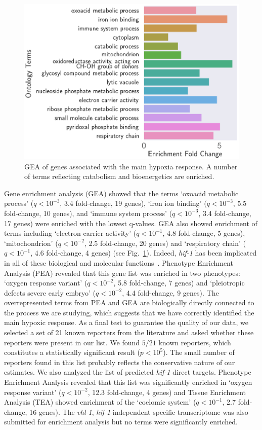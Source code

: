 \documentclass[9pt,twocolumn,twoside]{pnas-new}
\newcommand{\qval}[1]{$q<10^{-#1}$}
\newcommand{\vhl}{\emph{vhl-1}}
\newcommand{\hif}{\emph{hif-1}}
\begin{document}
\begin{figure}[tbhp]
\centering
\includegraphics[width=\linewidth]{figs/hypoxia_response_gea.pdf}
\caption{
GEA of genes associated with the main hypoxia response. A number of terms
reflecting catabolism and bioenergetics are enriched.
}
\label{fig:hyp_gea}
\end{figure}

Gene enrichment analysis (GEA) showed that the terms `oxoacid metabolic process'
(\qval{3}, 3.4 fold-change, 19 genes),
`iron ion binding' (\qval{3}, 5.5 fold-change, 10 genes),
and `immune system process' (\qval{3}, 3.4 fold-change, 17 genes) were enriched
with the lowest q-values. GEA also showed enrichment of terms including
`electron carrier activity' (\qval{1}, 4.8 fold-change, 5 genes),
`mitochondrion' (\qval{2}, 2.5 fold-change, 20 genes)
and `respiratory chain' (\qval{1}, 4.6 fold-change, 4 genes) (see
Fig.~\ref{fig:hyp_gea}). Indeed, \hif{} has been implicated in
all of these biological and molecular functions~\cite{Luhachack2012,Ackerman2012,
Romney2011,Semenza2011}. Phenotype Enrichment Analysis (PEA) revealed that this
gene list was enriched in two phenotypes: `oxygen response variant' (\qval{2},
5.8 fold-change, 7 genes) and `pleiotropic defects severe early embryo' (\qval{2},
4.4 fold-change, 9 genes). The overrepresented terms from PEA and GEA are biologically
directly connected to the process we are studying, which suggests that we have
correctly identified the main hypoxic response. As a final test to guarantee the
quality of our data, we selected a set of 21 known reporters from the literature
and asked whether these reporters were present in our list. We found $5/21$ known
reporters, which constitutes a statistically significant result ($p<10^{5}$).
The small number of reporters found in this list probably reflects the conservative
nature of our estimates. We also analyzed the list of predicted \hif{} direct targets.
Phenotype Enrichment Analysis revealed that this list was significantly enriched in
`oxygen response variant' (\qval{2}, 12.3 fold-change, 4 genes) and Tissue Enrichment
Analysis (TEA) showed enrichment of the `coelomic system' (\qval{1}, 2.7 fold-change,
16 genes). The \vhl{}, \hif{}-independent specific transcriptome was also submitted
for enrichment analysis but no terms were significantly enriched.
\end{document}
